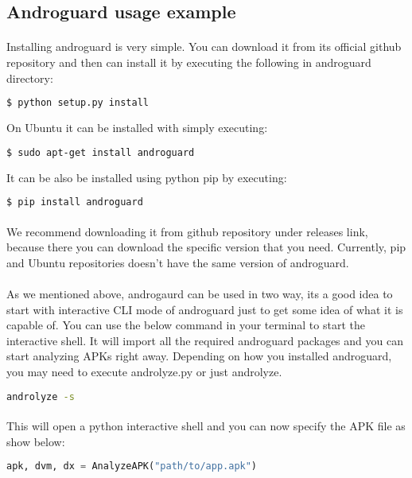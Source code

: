 \documentclass[../main.tex]{subfile}
\begin{document}
		\subsection{Androguard usage example}\label{subsec:androguard_usage}
			\paragraph{} Installing androguard is very simple. You can download it from its official github repository \cite{desnos2017androguard} and then can install it by executing the following in androguard directory:
			\begin{lstlisting}[language=bash]
				$ python setup.py install
			\end{lstlisting}
			On Ubuntu it can be installed with simply executing:
			\begin{lstlisting}[language=bash]
				$ sudo apt-get install androguard
			\end{lstlisting}
			It can be also be installed using python pip by executing:
			\begin{lstlisting}[language=bash]
				$ pip install androguard
			\end{lstlisting}
			\paragraph{} We recommend downloading it from github repository under releases link, because there you can download the specific version that you need. Currently, pip and Ubuntu repositories doesn't have the same version of androguard.

			\paragraph{} As we mentioned above, androgaurd can be used in two way, its a good idea to start with interactive CLI mode of androguard just to get some idea of what it is capable of. You can use the below command in your terminal to start the interactive shell. It will import all the required androguard packages and you can start analyzing APKs right away. Depending on how you installed androguard, you may need to execute androlyze.py or just androlyze.
				\begin{lstlisting}[language=bash, xrightmargin = 0.7\textwidth]
					androlyze -s
				\end{lstlisting}
			\paragraph{} This will open a python interactive shell and you can now specify the APK file as show below:
				\begin{lstlisting}[language=python]
					apk, dvm, dx = AnalyzeAPK("path/to/app.apk")
				\end{lstlisting}
\end{document}
